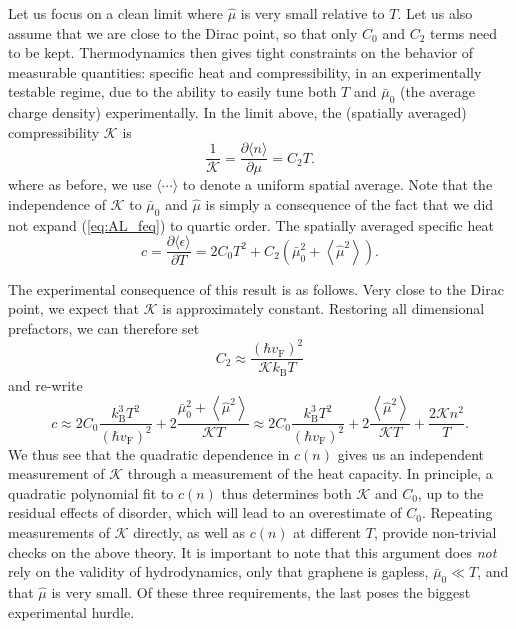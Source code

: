 Let us focus on a clean limit where $\hat\mu$ is very small relative to $T$.    Let us also assume that we are close to the Dirac point, so that only $C_0$ and $C_2$ terms need to be kept.   Thermodynamics then gives tight constraints on the behavior of measurable quantities: specific heat and compressibility,  in an experimentally testable regime, due to the ability to easily tune both $T$ and $\bar\mu_0$ (the average charge density) experimentally.  In the limit above, the (spatially averaged) compressibility $\mathcal{K}$ is \begin{equation}
\frac{1}{\mathcal{K}} = \frac{\partial \langle n\rangle}{\partial \mu}  = C_2T.
\end{equation}
where as before, we use $\langle\cdots\rangle$ to denote a uniform spatial average.    Note that the independence of $\mathcal{K}$ to $\bar\mu_0$ and $\hat\mu$ is simply a consequence of the fact that we did not expand (\ref{eq:AL_feq}) to quartic order.  The spatially averaged specific heat \begin{equation}
 c = \frac{\partial \langle \epsilon\rangle}{\partial T} = 2C_0T^2 + C_2\left(\bar\mu_0^2+\left\langle \hat\mu^2\right\rangle\right).
\end{equation}

The experimental consequence of this result is as follows.   Very close to the Dirac point, we expect that $\mathcal{K}$ is approximately constant.   Restoring all dimensional prefactors, we can therefore set \begin{equation}
C_2 \approx \frac{(\hbar v_{\mathrm{F}})^2}{\mathcal{K}k_{\mathrm{B}}T}
\end{equation}
and re-write \begin{equation}
c \approx 2C_0 \frac{k_{\mathrm{B}}^3T^2}{(\hbar v_{\mathrm{F}})^2} + 2\frac{\bar\mu_0^2+\left\langle \hat\mu^2\right\rangle}{\mathcal{K}T} \approx 2C_0 \frac{k_{\mathrm{B}}^3T^2}{(\hbar v_{\mathrm{F}})^2} + 2\frac{\left\langle \hat\mu^2\right\rangle}{\mathcal{K}T} + \frac{2\mathcal{K}  n^2}{T} .
\end{equation}
We thus see that the quadratic dependence in $c(n)$ gives us an independent measurement of $\mathcal{K}$ through a measurement of the heat capacity.   In principle, a quadratic polynomial fit to $c(n)$ thus determines both $\mathcal{K}$ and $C_0$,  up to the residual effects of disorder, which will lead to an overestimate of $C_0$.   Repeating measurements of $\mathcal{K}$ directly, as well as $c(n)$ at different $T$,  provide non-trivial checks on the above theory.   It is important to note that this argument does \emph{not} rely on the validity of hydrodynamics, only that graphene is gapless, $\bar\mu_0 \ll T$, and that $\hat\mu$ is very small.   Of these three requirements, the last poses the biggest experimental hurdle.


